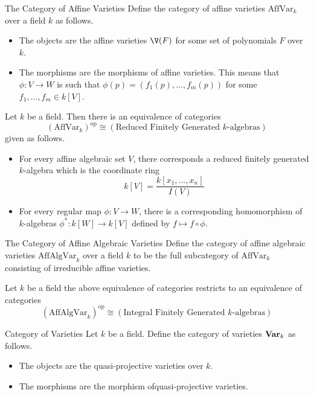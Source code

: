 \documentclass[a4paper]{article}
\begin{document}
\begin{defn}{The Category of Affine Varieties}{} Define the category of affine varieties $\text{AffVar}_k$ over a field $k$ as follows. 
\begin{itemize}
\item The objects are the affine varieties $\V(F)$ for some set of polynomials $F$ over $k$. 
\item The morphisms are the morphisms of affine varieties. This means that $\phi:V\to W$ is such that $\phi(p)=(f_1(p),\dots,f_m(p))$ for some $f_1,\dots,f_m\in k[V]$. 
\end{itemize}
\end{defn}

\begin{prp}{}{} Let $k$ be a field. Then there is an equivalence of categories $$(\text{AffVar}_k)^\text{op}\cong(\text{Reduced Finitely Generated }k\text{-algebras})$$
given as follows. 
\begin{itemize}
\item For every affine algebraic set $V$, there corresponds a reduced finitely generated $k$-algebra which is the coordinate ring $$k[V]=\frac{k[x_1,\dots,x_n]}{I(V)}$$
\item For every regular map $\phi:V\to W$, there is a corresponding homomorphism of $k$-algebras $\phi^\ast:k[W]\to k[V]$ defined by $f\mapsto f\circ\phi$. 
\end{itemize}
\end{prp}

\begin{defn}{The Category of Affine Algebraic Varieties}{} Define the category of affine algebraic varieties $\text{AffAlgVar}_k$ over a field $k$ to be the full subcategory of $\text{AffVar}_k$ consisting of irreducible affine varieties. 
\end{defn}

\begin{prp}{}{} Let $k$ be a field the above equivalence of categories restricts to an equivalence of categories $$(\text{AffAlgVar}_k)^\text{op}\cong(\text{Integral Finitely Generated }k\text{-algebras})$$
\end{prp}

\begin{defn}{Category of Varieties}{} Let $k$ be a field. Define the category of varieties $\bold{Var}_k$ as follows. 
\begin{itemize}
\item The objects are the quasi-projective varieties over $k$. 
\item The morphisms are the morphism ofquasi-projective varieties. 
\end{itemize}
\end{defn}
\end{document}
